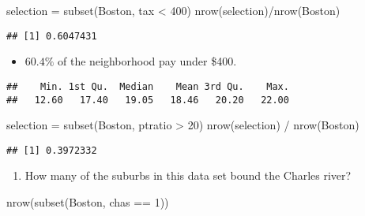 \documentclass[
]{article}
\newenvironment{Shaded}{\begin{snugshade}}{\end{snugshade}}
\newcommand{\DecValTok}[1]{\textcolor[rgb]{0.00,0.00,0.81}{#1}}
\newcommand{\FunctionTok}[1]{\textcolor[rgb]{0.00,0.00,0.00}{#1}}
\newcommand{\NormalTok}[1]{#1}
\newcommand{\OtherTok}[1]{\textcolor[rgb]{0.56,0.35,0.01}{#1}}
\newcommand{\SpecialCharTok}[1]{\textcolor[rgb]{0.00,0.00,0.00}{#1}}
\providecommand{\tightlist}{%
  \setlength{\itemsep}{0pt}\setlength{\parskip}{0pt}}
\begin{document}
\begin{Shaded}
\begin{Highlighting}[]
\NormalTok{selection }\OtherTok{=} \FunctionTok{subset}\NormalTok{(Boston, tax }\SpecialCharTok{\textless{}} \DecValTok{400}\NormalTok{)}
\FunctionTok{nrow}\NormalTok{(selection)}\SpecialCharTok{/}\FunctionTok{nrow}\NormalTok{(Boston)}
\end{Highlighting}
\end{Shaded}

\begin{verbatim}
## [1] 0.6047431
\end{verbatim}

\begin{itemize}
\tightlist
\item
  \(60.4\%\) of the neighborhood pay under \$400.
\end{itemize}

\begin{Shaded}
\end{Shaded}

\begin{verbatim}
##    Min. 1st Qu.  Median    Mean 3rd Qu.    Max. 
##   12.60   17.40   19.05   18.46   20.20   22.00
\end{verbatim}

\begin{Shaded}
\begin{Highlighting}[]
\NormalTok{selection }\OtherTok{=} \FunctionTok{subset}\NormalTok{(Boston, ptratio }\SpecialCharTok{\textgreater{}} \DecValTok{20}\NormalTok{)}
\FunctionTok{nrow}\NormalTok{(selection) }\SpecialCharTok{/} \FunctionTok{nrow}\NormalTok{(Boston)}
\end{Highlighting}
\end{Shaded}

\begin{verbatim}
## [1] 0.3972332
\end{verbatim}

\begin{enumerate}
\def\labelenumi{(\alph{enumi})}
\setcounter{enumi}{4}
\tightlist
\item
  How many of the suburbs in this data set bound the Charles river?
\end{enumerate}

\begin{Shaded}
\begin{Highlighting}[]
\FunctionTok{nrow}\NormalTok{(}\FunctionTok{subset}\NormalTok{(Boston, chas }\SpecialCharTok{==} \DecValTok{1}\NormalTok{))}
\end{Highlighting}
\end{Shaded}
\end{document}
